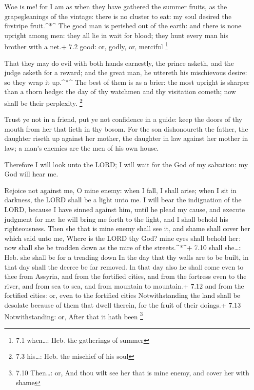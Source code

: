  Woe is me! for I am as when they have gathered the summer
fruits, as the grapegleanings of the vintage: there is no cluster to
eat: my soul desired the firstripe fruit.\^{}*\^{}  The good
man is perished out of the earth: and there is none upright among men:
they all lie in wait for blood; they hunt every man his brother with a
net.+ 7.2 good: or, godly, or, merciful \footnote{7.1 when\ldots: Heb.
  the gatherings of summer}

 That they may do evil with both hands earnestly, the prince
asketh, and the judge asketh for a reward; and the great man, he
uttereth his mischievous desire: so they wrap it up.\^{}*\^{}
 The best of them is as a brier: the most upright is sharper
than a thorn hedge: the day of thy watchmen and thy visitation cometh;
now shall be their perplexity. \footnote{7.3 his\ldots: Heb. the
  mischief of his soul}

 Trust ye not in a friend, put ye not confidence in a guide:
keep the doors of thy mouth from her that lieth in thy bosom.
 For the son dishonoureth the father, the daughter riseth up
against her mother, the daughter in law against her mother in law; a
man's enemies are the men of his own house.

 Therefore I will look unto the LORD; I will wait for the
God of my salvation: my God will hear me.

 Rejoice not against me, O mine enemy: when I fall, I shall
arise; when I sit in darkness, the LORD shall be a light unto me.
 I will bear the indignation of the LORD, because I have
sinned against him, until he plead my cause, and execute judgment for
me: he will bring me forth to the light, and I shall behold his
righteousness.  Then she that is mine enemy shall see it,
and shame shall cover her which said unto me, Where is the LORD thy God?
mine eyes shall behold her: now shall she be trodden down as the mire of
the streets.\^{}*\^{}+ 7.10 shall she\ldots: Heb. she shall be for a
treading down  In the day that thy walls are to be built,
in that day shall the decree be far removed.  In that day
also he shall come even to thee from Assyria, and from the fortified
cities, and from the fortress even to the river, and from sea to sea,
and from mountain to mountain.+ 7.12 and from the fortified cities: or,
even to the fortified cities  Notwithstanding the land
shall be desolate because of them that dwell therein, for the fruit of
their doings.+ 7.13 Notwithstanding: or, After that it hath been
\footnote{7.10 Then\ldots: or, And thou wilt see her that is mine enemy,
  and cover her with shame}

